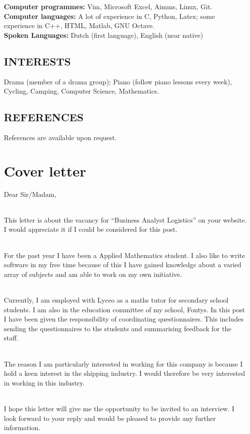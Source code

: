 \documentclass[titlepage]{article}
\begin{document}
\textbf{Computer programmes:} Vim, Microsoft Excel, Aimms, Linux, Git.
\\
\textbf{Computer languages:} A lot of experience in C, Python, Latex; some
experience in C++, HTML, Matlab, GNU Octave.
\\
\textbf{Spoken Languages:} Dutch (first language), English (near native)

\subsection{INTERESTS}

Drama (member of a drama group); Piano (follow piano lessons every
week), Cycling, Camping, Computer Science, Mathematics.

\subsection{REFERENCES}

References are available upon request.

\section{Cover letter}
Dear Sir/Madam,

\ 
\\
This letter is about the vacancy for “Business Analyst Logistics”
on your website. I would appreciate it if I could be considered for this post.

\
\\
For the past year I have been a Applied Mathematics student. I also like to
write software in my free time because of this I have gained knowledge about a
varied array of subjects and am able to work on my own initiative.

\ 
\\
Currently, I am employed with Lyceo as a maths tutor for secondary school
students. I am also in the education committee of my school, Fontys. In this
post I have been given the responsibility of coordinating questionnaires. This
includes sending the questionnaires to the students and summarising feedback
for the staff.  

\ 
\\
The reason I am particularly interested in working for this company is because I
hold a keen interest in the shipping industry. I would therefore be very
interested in working in this industry.

\ 
\\
I hope this letter will give me the opportunity to be invited to an interview.
I look forward to your reply and would be pleased to provide any further
information.
\end{document}
